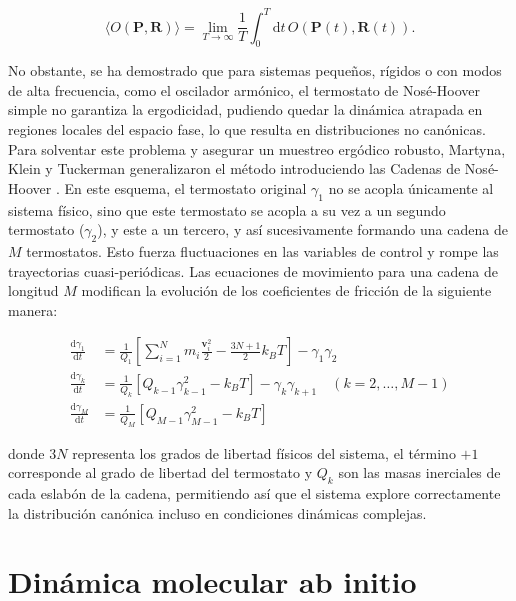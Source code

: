 \begin{equation}
    \langle O(\mathbf{P}, \mathbf{R}) \rangle = \lim_{T \to \infty} \frac{1}{T} \int_{0}^{T} \mathrm{d}t \, O(\mathbf{P}(t), \mathbf{R}(t)).
    \label{eq:ergodic_hypothesis}
\end{equation}

No obstante, se ha demostrado que para sistemas pequeños, rígidos o con modos de alta frecuencia, como el oscilador armónico, el termostato de Nosé-Hoover simple no garantiza la ergodicidad, pudiendo quedar la dinámica atrapada en regiones locales del espacio fase, lo que resulta en distribuciones no canónicas. Para solventar este problema y asegurar un muestreo ergódico robusto, Martyna, Klein y Tuckerman generalizaron el método introduciendo las Cadenas de Nosé-Hoover \cite{Hoover-1992-01}.
En este esquema, el termostato original $\gamma_1$ no se acopla únicamente al sistema físico, sino que este termostato se acopla a su vez a un segundo termostato ($\gamma_2$), y este a un tercero, y así sucesivamente formando una cadena de $M$ termostatos. Esto fuerza fluctuaciones en las variables de control y rompe las trayectorias cuasi-periódicas. Las ecuaciones de movimiento para una cadena de longitud $M$ modifican la evolución de los coeficientes de fricción de la siguiente manera:

\begin{align} 
    \frac{\mathrm{d}\gamma_1}{\mathrm{d}t} &= \frac{1}{Q_1} \left[ \sum_{i=1}^{N} m_{i} \frac{\mathbf{v}_i^2}{2} - \frac{3N + 1}{2} k_{B} T \right] - \gamma_1 \gamma_2 \\
    \frac{\mathrm{d}\gamma_k}{\mathrm{d}t} &= \frac{1}{Q_k} \left[ Q_{k-1} \gamma_{k-1}^2 - k_{B} T \right] - \gamma_k \gamma_{k+1} \quad (k = 2, \dots, M-1) \\
    \frac{\mathrm{d}\gamma_M}{\mathrm{d}t} &= \frac{1}{Q_M} \left[ Q_{M-1} \gamma_{M-1}^2 - k_{B} T \right] 
\end{align}

donde $3N$ representa los grados de libertad físicos del sistema, el término $+1$ corresponde al grado de libertad del termostato y $Q_k$ son las masas inerciales de cada eslabón de la cadena, permitiendo así que el sistema explore correctamente la distribución canónica incluso en condiciones dinámicas complejas.


\section{Dinámica molecular ab initio}

